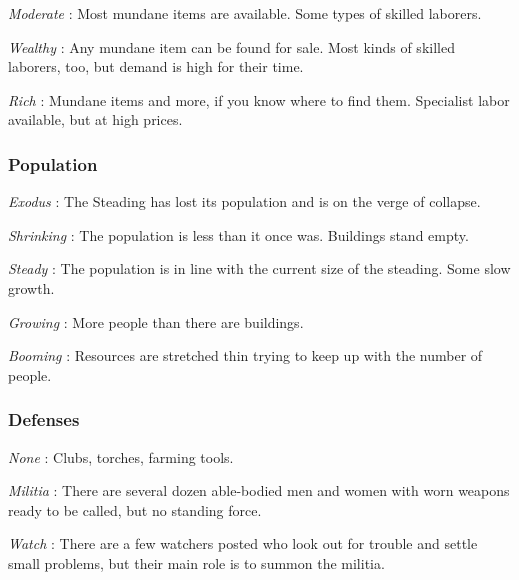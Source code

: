        

         {\em Moderate} : Most mundane items are available. Some types of skilled laborers.

       

         {\em Wealthy} : Any mundane item can be found for sale. Most kinds of skilled laborers, too, but demand is high for their time.

       

         {\em Rich} : Mundane items and more, if you know where to find them. Specialist labor available, but at high prices.

       
\subsubsection{Population}   
       

         {\em Exodus} : The Steading has lost its population and is on the verge of collapse.

       

         {\em Shrinking} : The population is less than it once was. Buildings stand empty.

       

         {\em Steady} : The population is in line with the current size of the steading. Some slow growth.

       

         {\em Growing} : More people than there are buildings.

       

         {\em Booming} : Resources are stretched thin trying to keep up with the number of people.

       
\subsubsection{Defenses}   
       

         {\em None} : Clubs, torches, farming tools.

       

         {\em Militia} : There are several dozen able-bodied men and women with worn weapons ready to be called, but no standing force.

       

         {\em Watch} : There are a few watchers posted who look out for trouble and settle small problems, but their main role is to summon the militia.

